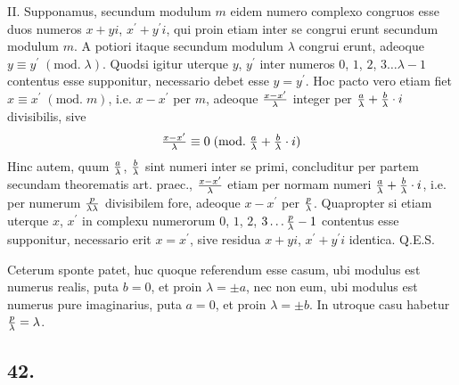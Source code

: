 \documentclass[twoside,12pt, showframe]{memoir}
\renewcommand{\pmod}[1]{\;(\textrm{mod.}\;#1)}
\let\oldfrac\frac
\def\frac#1#2{\mathchoice{\tfrac{#1}{#2}}{\oldfrac{#1}{#2}}{\genfrac{}{}{}{2}{#1}{#2\mathstrut}}{\genfrac{}{}{}{3}{#1}{#2\mathstrut}}}
\begin{document}
II. Supponamus, secundum modulum \(m\) eidem numero complexo congruos esse duos numeros \(x+y i\), \(x^{\prime}+y^{\prime} i\), qui proin etiam inter se congrui erunt secundum modulum \(m\). A potiori itaque secundum modulum \(\lambda\) congrui erunt, adeoque \(y \equiv y^{\prime}\pmod{\lambda}\). Quodsi igitur uterque \(y\), \(y^{\prime}\) inter numeros \(0\), \(1\), \(2\), \(3 \ldots \lambda-1\) contentus esse supponitur, necessario debet esse \(y=y^{\prime}\). Hoc pacto vero etiam fiet \(x \equiv x^{\prime}\pmod{m}\), i.e. \(x-x^{\prime}\) per \(m\), adeoque \(\frac{x-x^{\prime}}{\lambda}\) integer per \(\frac{a}{\lambda}+\frac{b}{\lambda} \cdot i\) divisibilis, sive
\[\frac{x-x^{\prime}}{\lambda} \equiv 0\pmod{\frac{a}{\lambda}+\frac{b}{\lambda} \cdot i}\]
Hinc autem, quum \(\frac{a}{\lambda}\), \(\frac{b}{\lambda}\) sint numeri inter se primi, concluditur per partem secundam theorematis art. praec., \(\frac{x-x^{\prime}}{\lambda}\) etiam per normam numeri \(\frac{a}{\lambda}+\frac{b}{\lambda} \cdot i\), i.e. per numerum \(\frac{p}{\lambda \lambda}\) divisibilem fore, adeoque \(x-x^{\prime}\) per \(\frac{p}{\lambda}\). Quapropter si etiam uterque \(x\), \(x^{\prime}\) in complexu numerorum \(0\), \(1\), \(2\), \(3 \ldots \frac{p}{\lambda}-1\) contentus esse supponitur, necessario erit \(x=x^{\prime}\), sive residua \(x+y i\), \(x^{\prime}+y^{\prime} i\) identica. Q.E.S.

Ceterum sponte patet, huc quoque referendum esse casum, ubi modulus est numerus realis, puta \(b=0\), et proin \(\lambda= \pm a\), nec non eum, ubi modulus est numerus pure imaginarius, puta \(a=0\), et proin \(\lambda= \pm b\). In utroque casu habetur \(\frac{p}{\lambda}=\lambda\).\clearpage\noindent%

\subsection*{42.}
 
\end{document}
